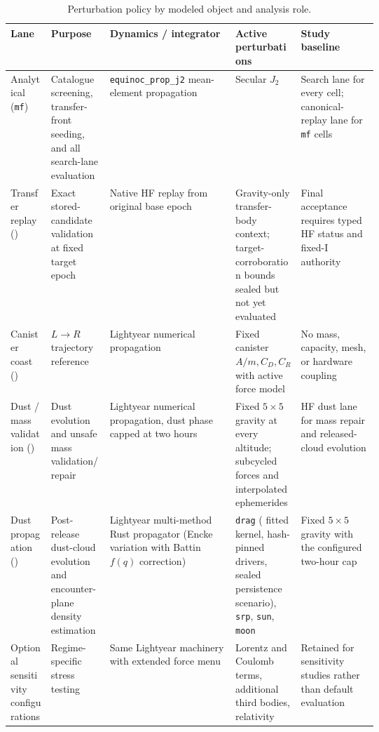         \begin{table}[htb]
            \centering
            \caption[Perturbation policy by lane]{Perturbation policy by modeled object and analysis role.}
            \label{tab:lane_perturb_policy}
            \small
            \begin{tabularx}{0.96\linewidth}{@{}L{0.11\linewidth}L{0.16\linewidth}Y L{0.13\linewidth}L{0.21\linewidth}@{}}
                \toprule
                \textbf{Lane} & \textbf{Purpose} & \textbf{Dynamics / integrator} & \textbf{Active perturbations} & \textbf{Study baseline} \\
                \midrule
                Analytical (\texttt{mf}) & Catalogue screening, transfer-front seeding, and all search-lane evaluation & \texttt{equinoc\_prop\_j2} mean-element propagation & Secular \(J_2\) & Search lane for every cell; canonical-replay lane for \texttt{mf} cells \\
                Transfer replay () & Exact stored-candidate validation at fixed target epoch & Native HF replay from original base epoch & Gravity-only transfer-body context; target-corroboration bounds sealed but not yet evaluated & Final acceptance requires typed HF status and fixed-I authority \\
                Canister coast () & \(L\rightarrow R\) trajectory reference & Lightyear numerical propagation & Fixed canister \(A/m,C_D,C_R\) with active force model & No mass, capacity, mesh, or hardware coupling \\
                Dust / mass validation () & Dust evolution and unsafe mass validation/repair & Lightyear numerical propagation, dust phase capped at two hours & Fixed \(5\times5\) gravity at every altitude; subcycled forces and interpolated ephemerides & HF dust lane for mass repair and released-cloud evolution \\
                Dust propagation () & Post-release dust-cloud evolution and encounter-plane density estimation & Lightyear multi-method Rust propagator (Encke variation with Battin $f(q)$ correction) & \texttt{drag} ( fitted kernel, hash-pinned drivers, sealed persistence scenario), \texttt{srp}, \texttt{sun}, \texttt{moon} & Fixed \(5\times5\) gravity with the configured two-hour cap \\
                Optional sensitivity configurations & Regime-specific stress testing & Same Lightyear machinery with extended force menu & Lorentz and Coulomb terms, additional third bodies, relativity & Retained for sensitivity studies rather than default evaluation \\
                \bottomrule
            \end{tabularx}
        \end{table}

